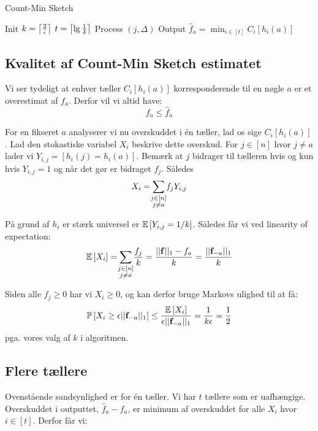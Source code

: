 \begin{algorithm}[H] \caption{Count-Min Sketch} \label{alg:count-min}
  \nonl Init\;
  $k = \left\lceil \frac{2}{\epsilon} \right\rceil$\;
  \BlankLine
  $t = \left\lceil \lg \frac{1}{\delta} \right\rceil$\;
  \BlankLine
  \nonl Process $(j, \Delta)$\;
  \nonl Output\;
  \Return $\hat f_a = \min_{i \in [t]} C_i [h_i(a)]$
\end{algorithm}\vspace{1em}

\subsection{Kvalitet af Count-Min Sketch estimatet}

Vi ser tydeligt at enhver tæller $C_i[h_i(a)]$ korresponderende til en nøgle $a$ er et overestimat af $f_a$. Derfor vil vi altid have:
$$
f_a \leq \hat f_a
$$

For en fikseret $a$ analyserer vi nu overskuddet i én tæller, lad os sige $C_i[h_i(a)]$. Lad den stokastiske variabel $X_i$ beskrive dette overskud. For $j \in [n]$ hvor $j \neq a$ lader vi $Y_{i,j} = [h_i(j) = h_i(a)]$. Bemærk at $j$ bidrager til tælleren hvis og kun hvis $Y_{i,j} = 1$ og når det gør er bidraget $f_j$. Således
$$
  X_i = \summ{j \in [n]\\ j \neq a} f_j Y_{i,j}
$$


På grund af $h_i$ er stærk universel er $\mathbb{E} \left[  Y_{i,j} = 1/k  \right]$. Således får vi ved linearity of expectation:
$$
  \E{X_i}
  = \summ{j \in [n]\\ j \neq a} \frac{f_j}{k}
  = \frac{||\mathbf f||_1 - f_a}{k}
  = \frac{||\mathbf f_{-a}||_1}{k}
$$

Siden alle $f_j \geq 0$ har vi $X_i \geq 0$, og kan derfor bruge Markovs ulighed til at få:
$$
  \mathbb{P} \left[  X_i \geq \epsilon ||\mathbf f_{-a}||_1  \right]
  \leq \frac{\mathbb{E} \left[  X_i  \right]}{\epsilon ||\mathbf f_{-a}||_1}
  = \frac{1}{k \epsilon}
  = \frac{1}{2}
$$
pga. vores valg af $k$ i algoritmen.

\subsection{Flere tællere}
Ovenstående sandsynlighed er for én tæller. Vi har $t$ tællere som er uafhængige. Overskuddet i outputtet, $\hat f_a - f_a$, er minimum af overskuddet for alle $X_i$ hvor $i \in [t]$. Derfor får vi:

